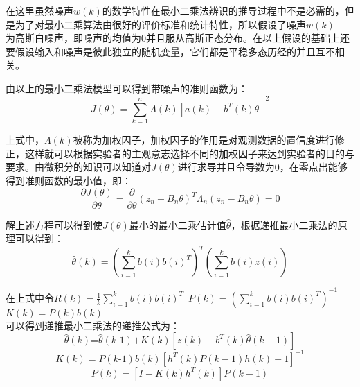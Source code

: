 在这里虽然噪声$w(k)$的数学特性在最小二乘法辨识的推导过程中不是必需的，但是为了对最小二乘算法由很好的评价标准和统计特性，所以假设了噪声$w(k)$\\为高斯白噪声，即噪声的均值为0并且服从高斯正态分布。在以上假设的基础上还要假设输入和噪声是彼此独立的随机变量，它们都是平稳多态历经的并且互不相关。

由以上的最小二乘法模型可以得到带噪声的准则函数为：
\begin{equation}
J\left( \theta  \right)={{\sum\limits_{k=1}^{n}{\Lambda \left( k \right)\left[ a(k)-{{b}^{T}}(k)\theta  \right]}}^{2}}
\end{equation}

上式中，$\Lambda \left( k \right)$被称为加权因子，加权因子的作用是对观测数据的置信度进行修正，这样就可以根据实验者的主观意志选择不同的加权因子来达到实验者的目的与要求。由微积分的知识可以知道对$J\left( \theta  \right)$进行求导并且令导数为0，在零点出能够得到准则函数的最小值，即：
\begin{equation}
\frac{\partial J\left( \theta  \right)}{\partial \theta }=\frac{\partial }{\partial \theta }{{\left( {{z}_{n}}-{{B}_{n}}\theta  \right)}^{T}}{{\Lambda }_{n}}\left( {{z}_{n}}-{{B}_{n}}\theta  \right)=0
\end{equation}

解上述方程可以得到使$J\left( \theta  \right)$最小的最小二乘估计值$\hat{\theta }$，根据递推最小二乘法的原理可以得到：
\begin{equation}
\hat{\theta }\left( k \right)={{\left( \sum\limits_{i=1}^{k}{b\left( i \right)b{{\left( i \right)}^{T}}} \right)}^{T}}\left( \sum\limits_{i=1}^{k}{b\left( i \right)z\left( i \right)} \right)
\end{equation}

在上式中令$R\left( k \right)=\frac{1}{k}\sum\limits_{i=1}^{k}{b\left( i \right)b{{\left( i \right)}^{T}}}$~$P\left( k \right)={{\left( \sum\limits_{i=1}^{k}{b\left( i \right)b{{\left( i \right)}^{T}}} \right)}^{-1}}$~$K\left( k \right)=P\left( k \right)b\left( k \right)$\\可以得到递推最小二乘法的递推公式为：
\begin{equation}
\hat{\theta }\left( k \right)\text{=}\hat{\theta }\left( k\text{-}1 \right)\text{+}K\left( k \right)\left[ z\left( k \right)-{{b}^{T}}\left( k \right)\hat{\theta }\left( k-1 \right) \right]
\end{equation}
\begin{equation}
K\left( k \right)=P\left( k\text{-}1 \right)b\left( k \right){{\left[ {{h}^{T}}\left( k \right)P\left( k-1 \right)h\left( k \right)+1 \right]}^{-1}}
\end{equation}
\begin{equation}
P\left( k \right)=\left[ I-K\left( k \right){{h}^{T}}\left( k \right) \right]P\left( k-1 \right)
\end{equation}

